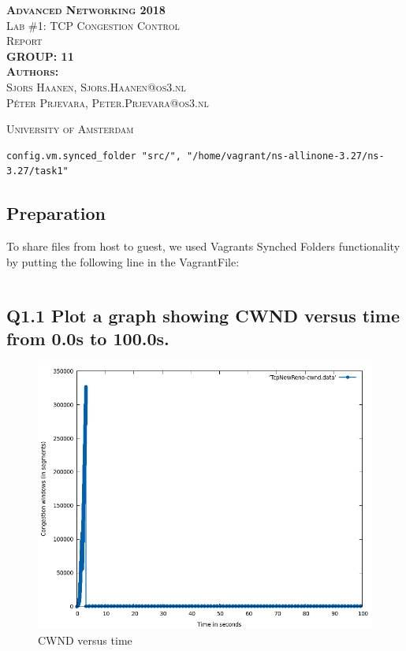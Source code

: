 \documentclass{article}
\begin{document}
\begin{titlepage}
\begin{center}
\textsc{\huge \bfseries Advanced Networking 2018}\\[1.5cm]
\textsc{\large Lab \#1: TCP Congestion Control}\\[1.5cm]
\textsc{\huge Report}\\[1.5cm]
\textsc{\huge \bfseries GROUP: 11}\\[1.5cm]
\textsc{\large{\textbf{Authors:}\\ Sjors Haanen, Sjors.Haanen@os3.nl\\ Péter Prjevara, Peter.Prjevara@os3.nl}}

\textsc{\large University of Amsterdam}
\end{center}
\end{titlepage}

\begin{lstlisting}[caption=<EXAMPLE>]
config.vm.synced_folder "src/", "/home/vagrant/ns-allinone-3.27/ns-3.27/task1"
\end{lstlisting}

\subsection{Preparation}

To share files from host to guest, we used Vagrants Synched Folders functionality by putting the following line in the VagrantFile:

\begin{lstlisting}[caption=Vagrant Synched Folders config]

\end{lstlisting}

\subsection{Q1.1 Plot a graph showing CWND versus time from 0.0s to
100.0s.}

\begin{figure}[h]
    \centering
    \includegraphics[scale=0.5]{images/lab1-group11-task1-question1.png}
    \caption{CWND versus time}
    \label{fig:q1-1}
\end{figure}
\end{document}
